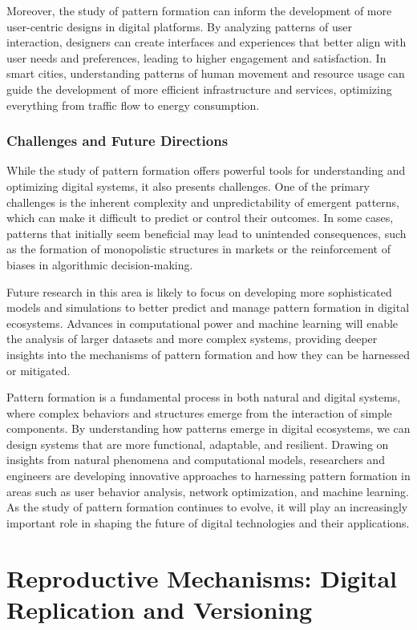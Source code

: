 \documentclass[12pt,twoside]{article}
\begin{document}
Moreover, the study of pattern formation can inform the development of more user-centric designs in digital platforms. By analyzing patterns of user interaction, designers can create interfaces and experiences that better align with user needs and preferences, leading to higher engagement and satisfaction. In smart cities, understanding patterns of human movement and resource usage can guide the development of more efficient infrastructure and services, optimizing everything from traffic flow to energy consumption.

\subsubsection{Challenges and Future Directions}

While the study of pattern formation offers powerful tools for understanding and optimizing digital systems, it also presents challenges. One of the primary challenges is the inherent complexity and unpredictability of emergent patterns, which can make it difficult to predict or control their outcomes. In some cases, patterns that initially seem beneficial may lead to unintended consequences, such as the formation of monopolistic structures in markets or the reinforcement of biases in algorithmic decision-making.

Future research in this area is likely to focus on developing more sophisticated models and simulations to better predict and manage pattern formation in digital ecosystems. Advances in computational power and machine learning will enable the analysis of larger datasets and more complex systems, providing deeper insights into the mechanisms of pattern formation and how they can be harnessed or mitigated.

Pattern formation is a fundamental process in both natural and digital systems, where complex behaviors and structures emerge from the interaction of simple components. By understanding how patterns emerge in digital ecosystems, we can design systems that are more functional, adaptable, and resilient. Drawing on insights from natural phenomena and computational models, researchers and engineers are developing innovative approaches to harnessing pattern formation in areas such as user behavior analysis, network optimization, and machine learning. As the study of pattern formation continues to evolve, it will play an increasingly important role in shaping the future of digital technologies and their applications.

\section{Reproductive Mechanisms: Digital Replication and Versioning}
\end{document}
